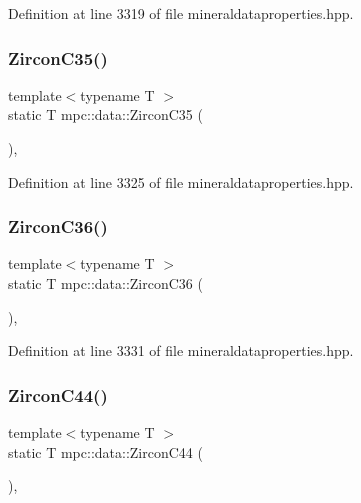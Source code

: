 Definition at line 3319 of file mineraldataproperties.\+hpp.

\mbox{\label{namespacempc_1_1data_a3a82c293a9526870aa7dffe6ded7b2b1}} 
\subsubsection{\texorpdfstring{Zircon\+C35()}{ZirconC35()}}
{\footnotesize\ttfamily template$<$typename T $>$ \\
static T mpc\+::data\+::\+Zircon\+C35 (\begin{DoxyParamCaption}{ }\end{DoxyParamCaption})\hspace{0.3cm}{\ttfamily [inline]}, {\ttfamily [static]}}



Definition at line 3325 of file mineraldataproperties.\+hpp.

\mbox{\label{namespacempc_1_1data_a9d6f73e96cf44ec1391190234855f0ce}} 
\subsubsection{\texorpdfstring{Zircon\+C36()}{ZirconC36()}}
{\footnotesize\ttfamily template$<$typename T $>$ \\
static T mpc\+::data\+::\+Zircon\+C36 (\begin{DoxyParamCaption}{ }\end{DoxyParamCaption})\hspace{0.3cm}{\ttfamily [inline]}, {\ttfamily [static]}}



Definition at line 3331 of file mineraldataproperties.\+hpp.

\mbox{\label{namespacempc_1_1data_a937ae006b9c84067fcf98c385bf33c06}} 
\subsubsection{\texorpdfstring{Zircon\+C44()}{ZirconC44()}}
{\footnotesize\ttfamily template$<$typename T $>$ \\
static T mpc\+::data\+::\+Zircon\+C44 (\begin{DoxyParamCaption}{ }\end{DoxyParamCaption})\hspace{0.3cm}{\ttfamily [inline]}, {\ttfamily [static]}}



